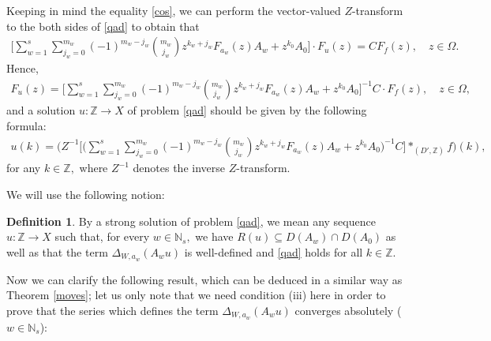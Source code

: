 \documentclass{amsart}
\theoremstyle{definition}
\newtheorem{defn}[thm]{Definition}
\theoremstyle{remark}
\numberwithin{equation}{section}
\begin{document}
Keeping in mind the equality \eqref{cos},
we can perform the vector-valued $Z$-transform to the both sides of \eqref{qad} to obtain that 
\begin{align*}
\Biggl[ \sum_{w=1}^{s}\sum_{j_{w}=0}^{m_{w}}(-1)^{m_{w}-j_{w}}\binom{m_{w}}{j_{w}}z^{k_{w}+j_{w}}F_{a_{w}}(z)A_{w}+z^{k_{0}}A_{0}\Biggr] \cdot F_{u}(z)=CF_{f}(z),\quad z\in \Omega.
\end{align*}
Hence, 
\begin{align*}
F_{u}(z)=\Biggl[ \sum_{w=1}^{s}\sum_{j_{w}=0}^{m_{w}}(-1)^{m_{w}-j_{w}}\binom{m_{w}}{j_{w}}z^{k_{w}+j_{w}}F_{a_{w}}(z)A_{w}+z^{k_{0}}A_{0}\Biggr] ^{-1}C \cdot F_{f}(z),\quad z\in \Omega ,
\end{align*}
and a solution $u :  {\mathbb Z} \rightarrow X$ of problem \eqref{qad} should be given by the following formula:{\small
\begin{align*}
u(k)= \Biggl(Z^{-1}\Biggl[ \Biggl(\sum_{w=1}^{s}\sum_{j_{w}=0}^{m_{w}}(-1)^{m_{w}-j_{w}}\binom{m_{w}}{j_{w}}z^{k_{w}+j_{w}}F_{a_{w}}(z)A_{w}+z^{k_{0}}A_{0}\Biggr) ^{-1}C\Biggr]  \ast_{(D',{\mathbb Z})} f\Biggr)(k),
\end{align*}}
for any $k\in {\mathbb Z},$ where $Z^{-1}$ denotes the inverse $Z$-transform.

We will use the following notion:

\begin{defn}\label{evroliga}
By a strong solution of problem \eqref{qad}, we mean any sequence $u : {\mathbb Z} \rightarrow X$ such that, for every $w\in {\mathbb N}_{s},$ we have $R(u)\subseteq D(A_{w}) \cap D(A_{0})$ as well as that the term $\Delta_{W,a_{w}}(A_{w}u)$ is well-defined and \eqref{qad} holds for all $k\in {\mathbb Z}.$
\end{defn}

Now we can clarify the following result, which can be deduced in a similar way as Theorem \ref{moves}; let us only note that we need condition (iii) here in order to prove that the series which defines the term $\Delta_{W,a_{w}}(A_{w}u)$ converges absolutely ($w\in {\mathbb N}_{s}$):
\end{document}
